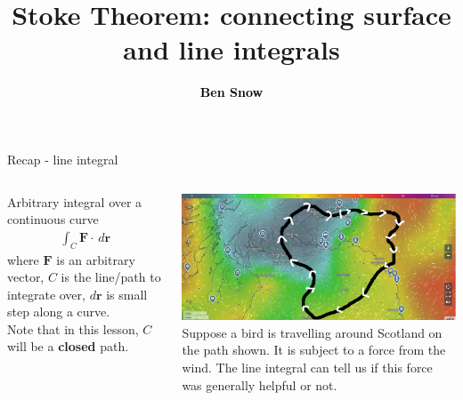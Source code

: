 \documentclass[10pt,aspectratio=169,usenames,dvipsnames]{beamer}
\title{Stoke Theorem: connecting surface and line integrals}
\date{}
\author{\textbf{\textcolor{black}{Ben Snow}}}
\institute{\textcolor{black}{University of Exeter} \\ \textcolor{black}{St Andrews, 17th March 2023.}}
\begin{document}
\maketitle

\begin{frame}{Recap - line integral}
\begin{columns}
\begin{column}{0.5\textwidth}
Arbitrary integral over a continuous curve
\begin{gather}
    \int_C \textbf{F} \cdot \,d\textbf{r}
\end{gather}
where $\textbf{F}$ is an arbitrary vector, $C$ is the line/path to integrate over, $d\textbf{r}$ is small step along a curve.\\
Note that in this lesson, $C$ will be a \textbf{closed} path.
\end{column}
\begin{column}{0.5\textwidth}
\includegraphics[width=0.95\linewidth]{2023StAndrews/lineexample.png} \\
Suppose a bird is travelling around Scotland on the path shown. It is subject to a force from the wind. The line integral can tell us if this force was generally helpful or not.
\end{column}
\end{columns}
\end{frame}
\end{document}
